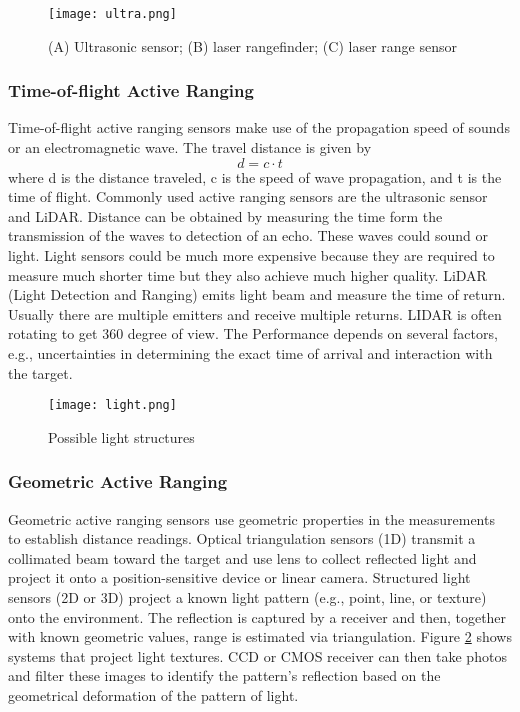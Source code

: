 \begin{itemize}
\begin{figure}
\centering
\texttt{[image: ultra.png]}
\caption{(A) Ultrasonic sensor; (B) laser rangefinder; (C) laser range sensor}
\label{fig:active_range}
\end{figure}

\subsubsection{Time-of-flight Active Ranging}
Time-of-flight active ranging sensors make use of the propagation speed of sounds or an electromagnetic wave. The travel distance is given by
$$d = c \cdot t$$
where d is the distance traveled, c is the speed of wave propagation, and t is the time of flight. Commonly used active ranging sensors are the ultrasonic sensor and LiDAR. Distance can be obtained by measuring the time form the transmission of the waves to detection of an echo. These waves could sound or light. Light sensors could be much more expensive because they are required to measure much shorter time but they also achieve much higher quality. LiDAR (Light Detection and Ranging) emits light beam and measure the time of return. Usually there are multiple emitters and receive multiple returns. LIDAR is often rotating to get 360 degree of view. The Performance depends on several factors, e.g., uncertainties in determining the exact time of arrival and interaction with the target.
\begin{figure}
\centering
\texttt{[image: light.png]}
\caption{Possible light structures \cite{SNS}}
\label{fig:3D_light}
\end{figure}


\subsubsection{Geometric Active Ranging}
Geometric active ranging sensors use geometric properties in the measurements to establish distance readings. Optical triangulation sensors (1D) transmit a collimated beam toward the target and use lens to collect reflected light and project it onto a position-sensitive device or linear camera. Structured light sensors (2D or 3D) project a known light pattern (e.g., point, line, or texture) onto the environment. The reflection is captured by a receiver and then, together with known geometric values, range is estimated via triangulation. Figure \ref{fig:3D_light} shows systems that project light textures. CCD or CMOS receiver can then take photos and filter these images to identify the pattern’s reflection based on the geometrical deformation of the pattern of light.

\end{itemize}
